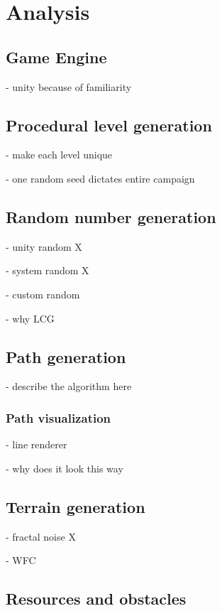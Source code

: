 \chapter{Analysis}

\section{Game Engine}

- unity because of familiarity

\section{Procedural level generation}

- make each level unique

- one random seed dictates entire campaign

\section{Random number generation}

- unity random X

- system random X

- custom random \checkmark

- why LCG

\section{Path generation}

- describe the algorithm here

\subsection{Path visualization}

- line renderer \checkmark

- why does it look this way

\section{Terrain generation}

- fractal noise X

- WFC \checkmark

\section{Resources and obstacles}


